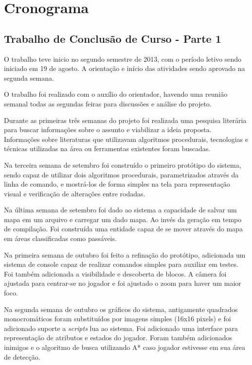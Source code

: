 \chapter[Cronograma]{Cronograma}

\section{Trabalho de Conclusão de Curso - Parte 1}

O trabalho teve inicio no segundo semestre de 2013, com o período letivo sendo iniciado em 19 de agosto. A orientação e início das atividades sendo aprovado na segunda semana. 

O trabalho foi realizado com o auxílio do orientador, havendo uma reunião semanal todas as segundas feiras para discussões e análise do projeto. 

Durante as primeiras três semanas do projeto foi realizada uma pesquisa literária para buscar informações sobre o assunto e viabilizar a ideia proposta. Informações sobre literaturas que utilizavam algoritmos procedurais, tecnologias e técnicas utilizadas na área ou ferramentas existentes foram buscadas. 

Na terceira semana de setembro foi construído o primeiro protótipo do sistema, sendo capaz de utilizar dois algoritmos procedurais, parametrizados através da linha de comando, e mostrá-los de forma simples na tela para representação visual e verificação de alterações entre rodadas. 

Na última semana de setembro foi dado ao sistema a capacidade de salvar um mapa em um arquivo e carregar um dado mapa. Ao invés da geração em tempo de compilação. Foi construída uma entidade capaz de se mover através do mapa em áreas classificadas como passáveis. 

Na primeira semana de outubro foi feito a refinação do protótipo, adicionada um sistema de console capaz de realizar comandos simples para auxiliar em testes. Foi também adicionada a visibilidade e descoberta de blocos. A câmera foi ajustada para centrar-se no jogador e foi ajustado o zoom para haver um maior foco. 

Na segunda semana de outubro os gráficos do sistema, antigamente quadrados monocromáticos foram substituídos por imagens simples (16x16 pixels) e foi adicionado suporte a \textit{scripts} lua ao sistema. 
Foi adicionado uma interface para representação de atributos e estados do jogador. Foram também adicionados inimigos e o algoritmo de busca utilizando A* caso jogador estivesse em sua área de detecção. 

